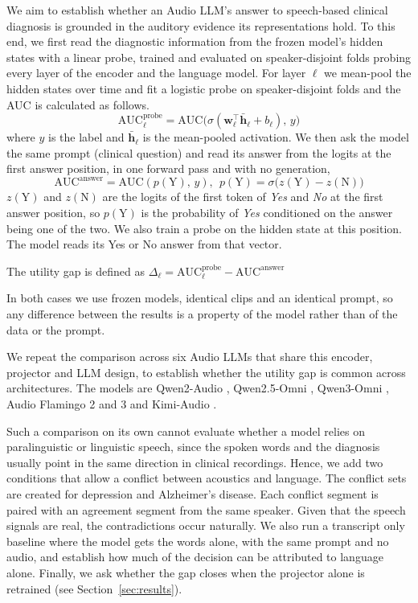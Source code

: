 \documentclass{article}
\begin{document}
We aim to establish whether an Audio LLM's answer to speech-based clinical diagnosis is grounded in the auditory evidence its representations hold. To this end, we first read the diagnostic information from the frozen model's hidden states with a linear probe, trained and evaluated on speaker-disjoint folds probing every layer of the encoder and the language model. For layer $\ell$ we mean-pool the hidden states over time and fit a logistic probe on speaker-disjoint folds and the AUC is calculated as follows.
\begin{equation}
\mathrm{AUC}^{\text{probe}}_\ell = \mathrm{AUC}\big(\sigma(\mathbf{w}_\ell^{\top}\bar{\mathbf{h}}_\ell + b_\ell),\, y\big)
\label{eq:probe} \end{equation}
where $y$ is the  label and $\bar{\mathbf{h}}_\ell$ is the mean-pooled activation. We then ask the model the same prompt (clinical question) and read its answer from the logits at the first answer position, in one forward pass and with no generation, 
\begin{equation}
\mathrm{AUC}^{\text{answer}} = \mathrm{AUC}(p(\text{Y}),\, y), \:\: p(\text{Y}) = \sigma\big(z(\text{Y}) - z(\text{N})\big) \label{eq:answer} 
\end{equation} 
$z(\text{Y})$ and $z(\text{N})$ are the logits of the first token of \emph{Yes} and \emph{No} at the first answer position, so $p(\text{Y})$ is the probability of \emph{Yes} conditioned on the answer being one of the two.  We also train a probe on the hidden state at this position. The model reads its Yes or No answer from that vector.

The utility gap is defined as $\Delta_\ell = \mathrm{AUC}^{\text{probe}}_\ell - \mathrm{AUC}^{\text{answer}}$

In both cases we use frozen models, identical clips and an identical prompt, so any difference between the results is a property of the model rather than of the data or the prompt.

We repeat the comparison across six Audio LLMs that share this encoder, projector and LLM design, to establish whether the utility gap is common across architectures. The models are Qwen2-Audio \cite{qwen2audio}, Qwen2.5-Omni \cite{qwen25omni}, Qwen3-Omni \cite{qwen3omni}, Audio Flamingo 2 and 3 \cite{af2,af3} and Kimi-Audio \cite{kimiaudio}.

Such a comparison on its own cannot evaluate whether a model relies on paralinguistic or linguistic speech, since the spoken words and the diagnosis usually point in the same direction in clinical recordings. Hence, we add two conditions that allow a conflict between acoustics and language. The conflict sets are created for depression and Alzheimer's disease. Each conflict segment is paired with an agreement segment from the same speaker. Given that the speech signals are real, the contradictions occur naturally. We also run a transcript only baseline where the model gets the words alone, with the same prompt and no audio, and establish how much of the decision can be attributed to language alone. Finally, we ask whether the gap closes when the projector alone is retrained (see Section~\ref{sec:results}).
\end{document}
